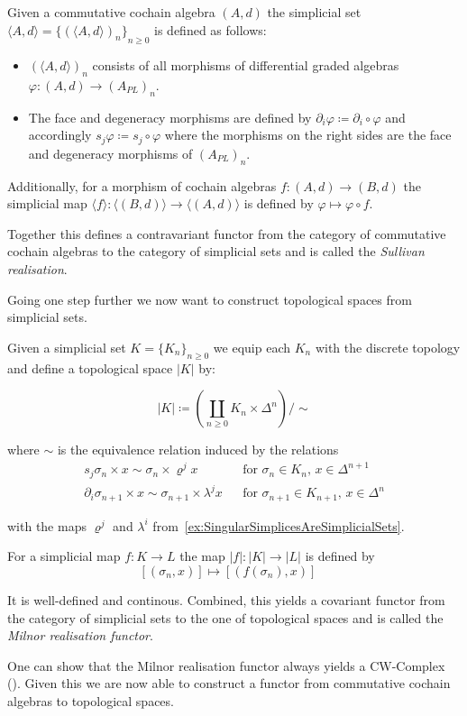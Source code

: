  \begin{Definition}
  Given a commutative cochain algebra $(A,d)$ the simplicial set 
  $\langle A , d \rangle = {\lbrace (\langle A , d \rangle)_n \rbrace}_{n \geq 0}$ is defined as follows: 
  \begin{itemize}
   \item $(\langle A,d \rangle)_n$ consists of all morphisms of differential graded algebras 
   $\varphi \colon (A,d) \to (A_{PL})_n$.
  \item The face and degeneracy morphisms are defined by $\partial_i \varphi \coloneqq \partial_i \circ \varphi$ and
  accordingly ${s_j \varphi \coloneqq s_j \circ \varphi}$ where the morphisms on the right sides are the face and degeneracy
  morphisms of $(A_{PL})_n$.
  \end{itemize}

  Additionally, for a morphism of cochain algebras ${f \colon (A,d) \to (B,d)}$ the simplicial map
  ${\langle f \rangle \colon \langle (B,d) \rangle \to \langle (A,d) \rangle}$ is defined by
  ${\varphi \mapsto \varphi \circ f}$. 
  
  Together this defines a contravariant functor from the category of commutative cochain algebras to the category of simplicial sets
  and is called the \emph{Sullivan realisation}.
 \end{Definition}

 Going one step further we now want to construct topological spaces from simplicial sets.
 
 \begin{Definition}
  Given a simplicial set $K = {\lbrace K_n \rbrace}_{n \geq 0}$ we equip each $K_n$ 
  with the discrete topology and define a topological space $|K|$ by:
  
  $$|K| \coloneqq (\coprod_{n \geq 0} K_n \times \Delta^n) / \sim$$
  
  where $\sim$ is the equivalence relation induced by the relations
  \begin{align*}
   s_j \sigma_n \times x \sim \sigma_n \times \varrho^j x & & \text{for $\sigma_n \in K_n$, $x \in \Delta^{n+1}$} \\
   \partial_i \sigma_{n+1} \times x \sim \sigma_{n+1} \times \lambda^j x & & \text{for $\sigma_{n+1} \in K_{n+1}$, $x \in \Delta^n$}
  \end{align*}

   
  with the maps $\varrho^j$ and $\lambda^i$ from~\ref{ex:SingularSimplicesAreSimplicialSets}.
  
  For a simplicial map $f \colon K \to L$ the map $|f| \colon |K| \to |L|$ is defined by
  $$ [(\sigma_n , x)] \mapsto [(f(\sigma_n) , x)] \quad $$
  
  It is well-defined and continous.
  Combined, this yields a covariant functor from the category of simplicial sets to the one of topological spaces and
  is called the \emph{Milnor realisation functor}.
 \end{Definition}
 One can show that the Milnor realisation functor always yields a CW-Complex (\cite{Milnor1957}).
 Given this we are now able to construct a functor from commutative cochain algebras to topological spaces.
 
